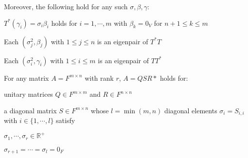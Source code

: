 \documentclass[8pt, twocolumn]{extarticle}
\newcommand{\realnum}{\mathbb{R}}
\begin{document}
\begin{description}
\begin{enumerate*}[label=({\alph*})]
\begin{enumerate*}[label={\arabic*}.]
                \end{enumerate*}
            \item Moreover, the following hold for any such $\sigma,\beta,\gamma$:
                \begin{enumerate*}[label={\arabic*}.]
                        \setcounter{enumii}{1}
                        \item $T^*(\gamma_i) = \sigma_i \beta_i$ holds for $i = 1,\cdots, m$ with $\beta_k = 0_V$ for $n+1 \leq k \leq m$
                        \item Each $(\sigma^2_j, \beta_j)$ with $1 \leq j \leq n$ is an eigenpair of $T^*T$
                        \item Each $(\sigma^2_i, \gamma_i)$ with $1 \leq i \leq m$ is an eigenpair of $TT^*$
                \end{enumerate*}
        \end{enumerate*}
    \item[6.27 SVD] For any matrix $A = F^{m\times n}$ with rank $r$, $A = QSR*$ holds for: 
        \begin{itemize*}
            \item unitary matrices $Q \in F^{m\times m}$ and $R \in F^{n\times n}$
            \item a diagonal matrix $S \in F^{m\times n}$ whose $l = \min (m, n)$ diagonal elements $\sigma_i = S_{i, i}$ with $i \in \{1,\cdots ,l\}$ satisfy 
                \begin{enumerate*}
                    \item $\sigma_1, \cdots , \sigma_r \in \realnum^+$
                    \item $\sigma_{r+1} = \cdots = \sigma_l = 0_F$
                \end{enumerate*}
        \end{itemize*}
        

\end{description}
\end{document}
